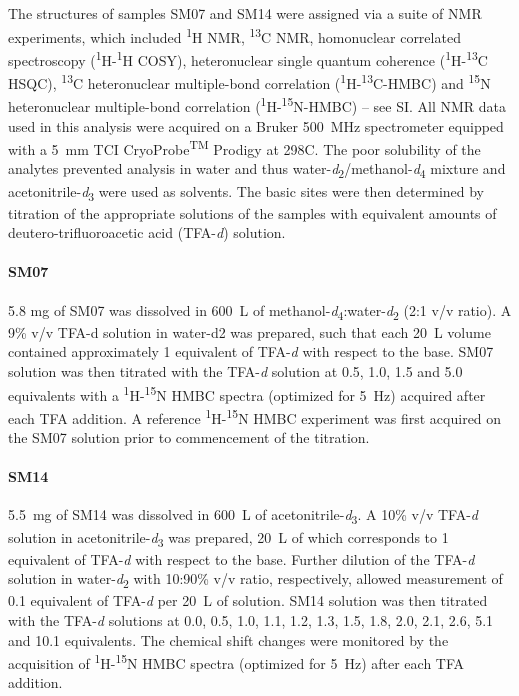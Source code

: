 \documentclass[9pt,lineno]{elife}
\begin{document}
The structures of samples SM07 and SM14 were assigned via a suite of NMR experiments, which included \textsuperscript{1}H NMR, \textsuperscript{13}C NMR, homonuclear correlated spectroscopy (\textsuperscript{1}H-\textsuperscript{1}H COSY), heteronuclear single quantum coherence (\textsuperscript{1}H-\textsuperscript{13}C HSQC), \textsuperscript{13}C heteronuclear multiple-bond correlation (\textsuperscript{1}H-\textsuperscript{13}C-HMBC) and \textsuperscript{15}N heteronuclear multiple-bond correlation (\textsuperscript{1}H-\textsuperscript{15}N-HMBC) – see SI. All NMR data used in this analysis were acquired on a Bruker 500~MHz spectrometer equipped with a 5~mm TCI CryoProbe\textsuperscript{TM} Prodigy at 298\textdegree C. The poor solubility of the analytes prevented analysis in water and thus water-\textit{d}\textsubscript{2}/methanol-\textit{d}\textsubscript{4} mixture and acetonitrile-\textit{d}\textsubscript{3} were used as solvents. The basic sites were then determined by titration of the appropriate solutions of the samples with equivalent amounts of deutero-trifluoroacetic acid (TFA-\textit{d}) solution.

\paragraph{SM07}
5.8 mg of SM07 was dissolved in 600~\micro L of methanol-\textit{d}\textsubscript{4}:water-\textit{d}\textsubscript{2} (2:1 v/v ratio). 
A 9\% v/v TFA-d solution in water-d2 was prepared, such that each 20~\micro L volume contained approximately 1 equivalent of TFA-\textit{d} with respect to the base.  
SM07 solution was then titrated with the TFA-\textit{d} solution at 0.5, 1.0, 1.5 and 5.0 equivalents with a \textsuperscript{1}H-\textsuperscript{15}N HMBC spectra (optimized for 5~Hz) acquired after each TFA addition. 
A reference \textsuperscript{1}H-\textsuperscript{15}N HMBC experiment was first acquired on the SM07 solution prior to commencement of the titration.

\paragraph{SM14}
5.5~mg of SM14 was dissolved in 600~\micro L of acetonitrile-\textit{d}\textsubscript{3}. 
A 10\% v/v TFA-\textit{d} solution in acetonitrile-\textit{d}\textsubscript{3} was prepared, 20~\micro L of which corresponds to 1 equivalent of TFA-\textit{d} with respect to the base.
Further dilution of the TFA-\textit{d} solution in water-\textit{d}\textsubscript{2} with 10:90\% v/v ratio, respectively, allowed measurement of 0.1 equivalent of TFA-\textit{d} per 20~\micro L of solution.  
SM14 solution was then titrated with the TFA-\textit{d} solutions at 0.0, 0.5, 1.0, 1.1, 1.2, 1.3, 1.5, 1.8, 2.0, 2.1, 2.6, 5.1 and 10.1 equivalents. 
The chemical shift changes were monitored by the acquisition of \textsuperscript{1}H-\textsuperscript{15}N HMBC spectra (optimized for 5~Hz) after each TFA addition.
\end{document}
